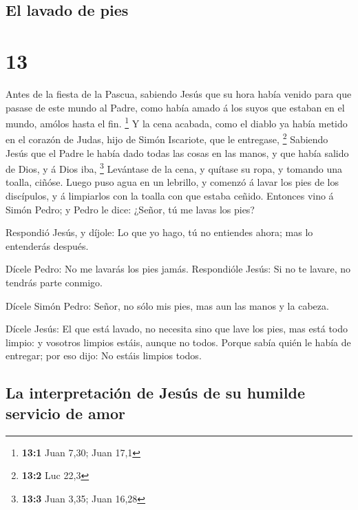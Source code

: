 \hypertarget{el-lavado-de-pies}{%
\subsection{El lavado de pies}\label{el-lavado-de-pies}}

\hypertarget{section-12}{%
\section{13}\label{section-12}}

 Antes de la fiesta de la Pascua, sabiendo Jesús que su hora
había venido para que pasase de este mundo al Padre, como había amado á
los suyos que estaban en el mundo, amólos hasta el fin. \footnote{\textbf{13:1}
  Juan 7,30; Juan 17,1}  Y la cena acabada, como el diablo
ya había metido en el corazón de Judas, hijo de Simón Iscariote, que le
entregase, \footnote{\textbf{13:2} Luc 22,3}  Sabiendo Jesús
que el Padre le había dado todas las cosas en las manos, y que había
salido de Dios, y á Dios iba, \footnote{\textbf{13:3} Juan 3,35; Juan
  16,28}  Levántase de la cena, y quítase su ropa, y tomando
una toalla, ciñóse.  Luego puso agua en un lebrillo, y
comenzó á lavar los pies de los discípulos, y á limpiarlos con la toalla
con que estaba ceñido.  Entonces vino á Simón Pedro; y Pedro
le dice: ¿Señor, tú me lavas los pies?

 Respondió Jesús, y díjole: Lo que yo hago, tú no entiendes
ahora; mas lo entenderás después.

 Dícele Pedro: No me lavarás los pies jamás. Respondióle
Jesús: Si no te lavare, no tendrás parte conmigo.

 Dícele Simón Pedro: Señor, no sólo mis pies, mas aun las
manos y la cabeza.

 Dícele Jesús: El que está lavado, no necesita sino que
lave los pies, mas está todo limpio: y vosotros limpios estáis, aunque
no todos.  Porque sabía quién le había de entregar; por eso
dijo: No estáis limpios todos.

\hypertarget{la-interpretaciuxf3n-de-jesuxfas-de-su-humilde-servicio-de-amor}{%
\subsection{La interpretación de Jesús de su humilde servicio de
amor}\label{la-interpretaciuxf3n-de-jesuxfas-de-su-humilde-servicio-de-amor}}

